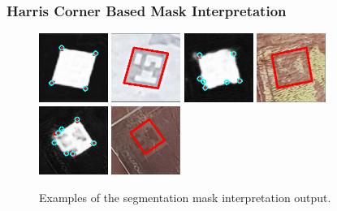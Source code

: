 \documentclass[10pt]{book}
\begin{document}
\subsubsection{Harris Corner Based Mask Interpretation}

\begin{figure}
  \centering
     {\includegraphics[width=0.2\textwidth]{image/segpet_mask_8_pred_corners}}
     {\includegraphics[width=0.2\textwidth]{image/segpet_mask_8_pred_rect}}
     {\includegraphics[width=0.2\textwidth]{image/segpet_mask_10_pred_corners}}
     {\includegraphics[width=0.2\textwidth]{image/segpet_mask_10_pred_rect}}
     {\includegraphics[width=0.2\textwidth]{image/segpet_mask_6_pred_corners}}
     {\includegraphics[width=0.2\textwidth]{image/segpet_mask_6_pred_rect}}
  \caption{Examples of the segmentation mask interpretation output.}
  \label{fig:segpet_rect_interp}
\end{figure}
\end{document}
